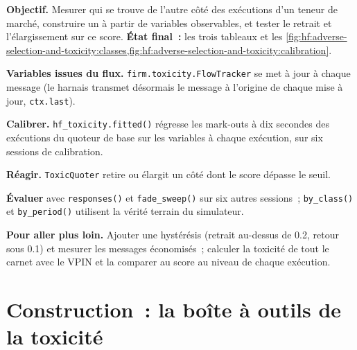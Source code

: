 \begin{tutorial}
\textbf{Objectif.} Mesurer qui se trouve de l'autre côté des exécutions d'un teneur de marché, construire un  à partir de variables observables, et tester le retrait et
l'élargissement sur ce score. \textbf{État final~:} les trois tableaux et les \cref{fig:hf:adverse-selection-and-toxicity:classes,fig:hf:adverse-selection-and-toxicity:calibration}.
\begin{tutsteps}
\item \textbf{Variables issues du flux.} \texttt{firm.toxicity.FlowTracker} se met à jour à chaque message (le harnais transmet désormais le message à l'origine de chaque
mise à jour, \texttt{ctx.last}).
\label{lst:hf:adverse-selection-and-toxicity:features}
\item \textbf{Calibrer.} \texttt{hf\_toxicity.fitted()} régresse les mark-outs à dix secondes des exécutions du quoteur de base sur les variables à chaque
exécution, sur six sessions de calibration.
\item \textbf{Réagir.} \texttt{ToxicQuoter} retire ou élargit un côté dont le score dépasse le seuil.
\label{lst:hf:adverse-selection-and-toxicity:quoter}
\item \textbf{Évaluer} avec \texttt{responses()} et \texttt{fade\_sweep()} sur six autres sessions~; \texttt{by\_class()} et \texttt{by\_period()} utilisent
la vérité terrain du simulateur.
\end{tutsteps}
\textbf{Pour aller plus loin.} Ajouter une hystérésis (retrait au-dessus de 0.2, retour sous 0.1) et mesurer les messages économisés~; calculer la toxicité de tout le carnet
avec le VPIN et la comparer au score au niveau de chaque exécution.
\end{tutorial}

\section{Construction~: la boîte à outils de la toxicité}\label{bld:hf:adverse-selection-and-toxicity:toxicity}

